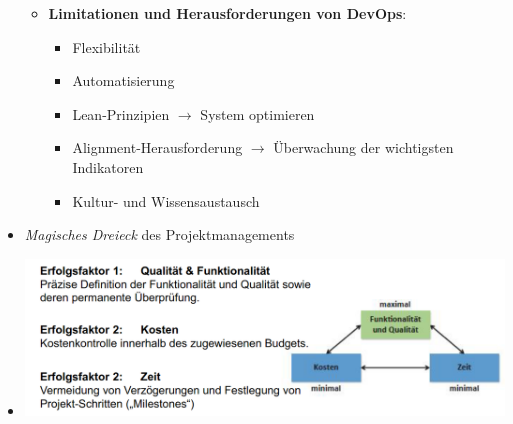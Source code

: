 \documentclass[12pt,a4paper]{article}
\begin{document}
\begin{itemize}
\begin{itemize}
			\item \textbf{Limitationen und Herausforderungen von DevOps}:
			   \begin{itemize}
					\item Flexibilität
					\item Automatisierung
					\item Lean-Prinzipien $\rightarrow$ System optimieren
					\item Alignment-Herausforderung $\rightarrow$ Überwachung der wichtigsten Indikatoren
					\item Kultur- und Wissensaustausch
            \end{itemize}
      \end{itemize}
   
   \item \emph{Magisches Dreieck} des Projektmanagements
   \item[] \includegraphics[scale=0.5]{magic.png}
\end{itemize}
\end{document}
